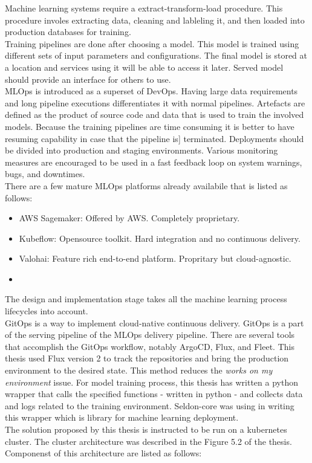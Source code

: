 \documentclass[a4paper, 10pt]{article}
\theoremstyle{nonumberplain}
\begin{document}
Machine learning systems require a extract-transform-load procedure.
This procedure involes extracting data, cleaning and lableling it, and then
loaded into production databases for training. \\
Training pipelines are done after choosing a model. This model is 
trained using different sets of input parameters and configurations.
The final model is stored at a location and services using it will be able 
to access it later. Served model should provide an interface for others to
use. \\
MLOps is introduced as a superset of DevOps. Having large data requirements
and long pipeline executions differentiates it with normal pipelines.
Artefacts are defined as the product of source code and data that is used to
train the involved models. Because the training pipelines are time consuming
it is better to have resuming capability in case that the pipeline is]
terminated. Deployments should be divided into production and staging
environments. Various monitoring measures are encouraged to be used in a 
fast feedback loop on system warnings, bugs, and downtimes.
\\
There are a few mature MLOps platforms already availabile that is listed as
follows:
\begin{itemize}
    \item AWS Sagemaker: Offered by AWS. Completely proprietary.
    \item Kubeflow: Opensource toolkit. Hard integration and no continuous
        delivery.
    \item Valohai: Feature rich end-to-end platform. Propritary but
        cloud-agnostic.
    \item 
\end{itemize}

The design and implementation stage takes all the machine learning process
lifecycles into account. \\
GitOps is a way to implement cloud-native continuous delivery. GitOps is
a part of the serving pipeline of the MLOps delivery pipeline. There are
several tools that accomplish the GitOps workflow, notably ArgoCD, Flux, and
Fleet. This thesis used Flux version 2 to track the repositories and
bring the production environment to the desired state. This method reduces
the \textit{works on my environment} issue. For model training process,
this thesis has written a python wrapper that calls the specified functions -
written in python - and collects data and logs related to the training
environment. Seldon-core was using in writing this wrapper which is library
for machine learning deployment. \\
The solution proposed by this thesis is instructed to be run on a kubernetes
cluster. The cluster architecture was described in the Figure 5.2 of the
thesis. Componenst of this architecture are listed as follows:
\end{document}
